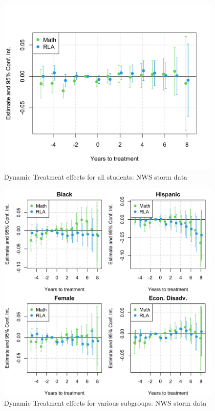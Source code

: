 \begin{figure}[!h]
	\centering
	\includegraphics[scale=1]{"../Code & Data/ResultsPlotStorm.png"}
	\caption{Dynamic Treatment effects for all students: NWS storm data}
	\label{ResultsPlotStorm}
\end{figure}

\begin{figure}[!h]
	\centering
	\includegraphics[scale=1]{"../Code & Data/ResultsPlotSubStorm.png"}
	\caption{Dynamic Treatment effects for various subgroups: NWS storm data}
	\label{ResultsPlotSubStorm}
\end{figure}








